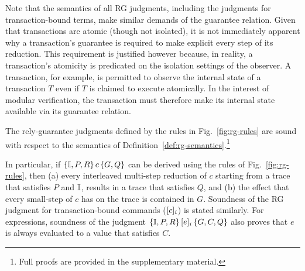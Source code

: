 Note that the semantics of all RG judgments, including the judgments
for transaction-bound terms, make similar demands of the guarantee
relation. Given that transactions are atomic (though not isolated), it
is not immediately apparent why a transaction's guarantee is required
to make explicit every step of its reduction. This requirement is
justified however because, in reality, a transaction's atomicity is
predicated on the isolation settings of the observer. A  transaction, for example, is permitted to observe the
internal state of a transaction $T$ even if $T$ is claimed to execute
atomically.  In the interest of modular verification, the transaction
must therefore make its internal state available via its guarantee
relation.

\begin{theorem} 
The rely-guarantee judgments defined by the rules in
Fig.~\ref{fig:rg-rules} are sound with respect to
the semantics of Definition~\ref{def:rg-semantics}.\footnote{Full proofs are provided in the supplementary material.}
\end{theorem}

\noindent In particular, if $\{\mathbb{I},P,R\}\,c\,\{G,Q\}$ can be derived using
the rules of Fig.~\ref{fig:rg-rules}, then (a) every interleaved
multi-step reduction of $c$ starting from a trace that satisfies $P$
and $\mathbb{I}$, results in a trace that satisfies $Q$, and (b) the effect
that every small-step of $c$ has on the trace is contained in $G$.
Soundness of the RG judgment for transaction-bound commands
($\lbrack c \rbrack_i$) is stated similarly.  For expressions, soundness of
the judgment $\{\mathbb{I},P,R\}\,\lbrack e \rbrack_i\,\{G,C,Q\}$ also proves that $e$
is always evaluated to a value that satisfies $C$.

